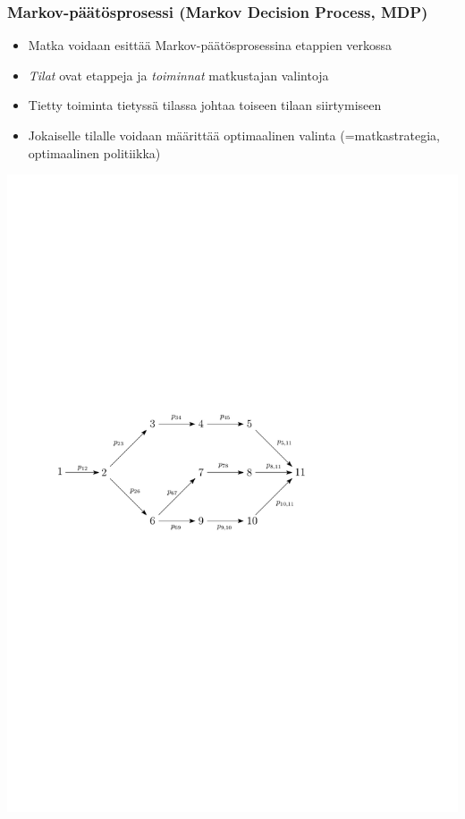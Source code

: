 \documentclass{beamer}
\begin{document}
    
    
        \begin{frame}
  \frametitle{Markov-päätösprosessi (Markov Decision Process, MDP)} 
  \begin{itemize}
   \item 
    Matka voidaan esittää Markov-päätösprosessina etappien verkossa
    \item
    \emph{Tilat} ovat etappeja ja \emph{toiminnat} matkustajan valintoja 
    \item
    Tietty toiminta tietyssä tilassa johtaa toiseen tilaan siirtymiseen
    \item
    Jokaiselle tilalle voidaan määrittää optimaalinen valinta (=matkastrategia, optimaalinen politiikka) 
\end{itemize}
     \begin{center}
     \includegraphics[scale=0.55]{walking01c}
      \end{center}
    \end{frame} 
    
\end{document}
